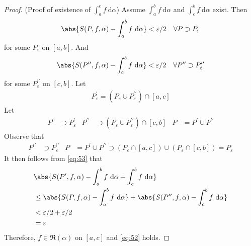 \documentclass[thmcnt=section, 12pt]{elegantbook}
\begin{document}
\begin{proof}
    \par (Proof of existence of $\int_a^c f \ \mathrm{d}\alpha$) Assume $\int_a^b f \ \mathrm{d}\alpha$ and $\int_c^b f \ \mathrm{d}\alpha$ exist. Then 
    \begin{align*}
        \abs{S(P, f, \alpha) - \int_a^b f \ \mathrm{d}\alpha} < \varepsilon / 2
        \quad \forall P \supset P_\varepsilon
    \end{align*}
    for some $P_\varepsilon$ on $[a, b]$. And
    \begin{align*}
        \abs{S(P^{\prime\prime}, f, \alpha) - \int_c^b f \ \mathrm{d}\alpha} < \varepsilon / 2
        \quad \forall P^{\prime\prime} \supset P_\varepsilon^{\prime\prime}
    \end{align*}
    for some $P_\varepsilon^{\prime\prime}$ on $[c, b]$.
    Let
    \begin{align*}
        P_\varepsilon^\prime = (P_\varepsilon \cup P_\varepsilon^{\prime\prime}) \cap [a, c]
    \end{align*}
    Let
    \begin{align*}
        P^\prime &\supset P_\varepsilon^\prime &
        P^{\prime\prime} &\supset (P_\varepsilon \cup P_\varepsilon^{\prime\prime}) \cap [c, b] &
        P &= P^\prime \cup P^{\prime\prime}
    \end{align*} 
    Observe that 
    \begin{align*}
        P^{\prime\prime} &\supset P_\varepsilon^{\prime\prime} &
        P &= P^\prime \cup P^{\prime\prime}
        \supset (P_\varepsilon \cap [a, c]) \cup (P_\varepsilon \cap [c, b])
        = P_\varepsilon
    \end{align*}
    It then follows from \eqref{eq:53} that
    \begin{align*}
        &\abs{
            S(P^\prime, f, \alpha)
            - \int_a^b f \ \mathrm{d}\alpha
            + \int_c^b f \ \mathrm{d}\alpha 
        } \\ 
        &\leq \abs{
            S(P, f, \alpha)
            - \int_a^b f \ \mathrm{d}\alpha
        } + \abs{
            S(P^{\prime\prime}, f, \alpha)
            - \int_c^b f \ \mathrm{d}\alpha
        } \\ 
        &< \varepsilon / 2 + \varepsilon / 2 \\ 
        &= \varepsilon
    \end{align*} 
    Therefore, $f \in \mathfrak{R}(\alpha)$ on $[a, c]$ and \eqref{eq:52} holds.

\end{proof}
\end{document}
